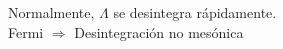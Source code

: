 \documentclass[preview]{standalone}
\begin{document}
\begin{center}
Normalmente, $\Lambda$ se desintegra rápidamente.\\
                    Fermi $\Rightarrow$ Desintegración no mesónica
\end{center}
\end{document}
